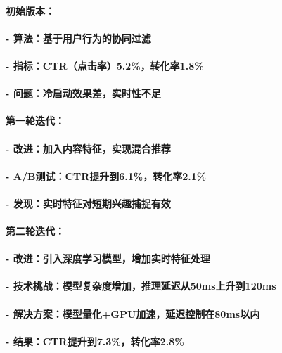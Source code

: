 \paragraph{\textbf{初始版本}：}
\paragraph{- 算法：基于用户行为的协同过滤}
\paragraph{- 指标：CTR（点击率）5.2\%，转化率1.8\%}
\paragraph{- 问题：冷启动效果差，实时性不足}

\paragraph{\textbf{第一轮迭代}：}
\paragraph{- 改进：加入内容特征，实现混合推荐}
\paragraph{- A/B测试：CTR提升到6.1\%，转化率2.1\%}
\paragraph{- 发现：实时特征对短期兴趣捕捉有效}

\paragraph{\textbf{第二轮迭代}：}
\paragraph{- 改进：引入深度学习模型，增加实时特征处理}
\paragraph{- 技术挑战：模型复杂度增加，推理延迟从50ms上升到120ms}
\paragraph{- 解决方案：模型量化+GPU加速，延迟控制在80ms以内}
\paragraph{- 结果：CTR提升到7.3\%，转化率2.8\%}

